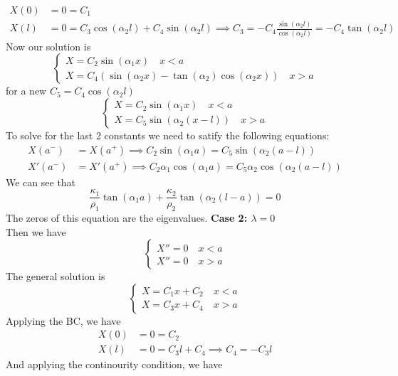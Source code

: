 \documentclass[answers,12pt,addpoints]{exam}
\begin{document}
\begin{questions}
\begin{solution}
        \begin{align*}
            X(0) &= 0 = C_1 \\
            X(l) &= 0 = C_3 \cos(\alpha_2 l) + C_4 \sin(\alpha_2 l) \implies C_3 = -C_4 \frac{\sin(\alpha_2 l)}{\cos(\alpha_2 l)} = -C_4 \tan(\alpha_2 l)
        \end{align*}
        Now our solution is
        $$\begin{cases}
            X = C_2 \sin(\alpha_1 x) \quad x < a \\
            X = C_4 (\sin(\alpha_2 x) - \tan(\alpha_2 )\cos(\alpha_2 x)) \quad x > a
        \end{cases}$$
        for a new $C_5 = C_4 \cos(\alpha_2 l)$
        $$ \begin{cases}
            X = C_2 \sin(\alpha_1 x) \quad x < a \\
            X = C_5 \sin(\alpha_2 (x-l))  \quad x > a
        \end{cases}$$
        To solve for the last 2 constants we need to satify the following equations:
        \begin{align*}
            X(a^-) &= X(a^+) \implies C_2 \sin(\alpha_1 a) = C_5 \sin(\alpha_2 (a-l)) \\
            X'(a^-) &= X'(a^+) \implies C_2 \alpha_1 \cos(\alpha_1 a) = C_5 \alpha_2 \cos(\alpha_2 (a-l))
        \end{align*}
        We can see that $$ \frac{\kappa_1}{\rho_1} \tan(\alpha_1 a) + \frac{\kappa_2}{\rho_2} \tan(\alpha_2 (l-a)) = 0$$ 
        The zeros of this equation are the eigenvalues.
        \textbf{Case 2: $\lambda = 0$} \\
        Then we have $$\begin{cases}
            X'' = 0 \quad x < a \\
            X'' = 0 \quad x > a
        \end{cases}$$
        The general solution is
        $$\begin{cases}
            X = C_1 x + C_2 \quad x < a \\
            X = C_3 x + C_4 \quad x > a
        \end{cases}$$
        Applying the BC, we have
        \begin{align*}
            X(0) &= 0 = C_2 \\
            X(l) &= 0 = C_3 l + C_4 \implies C_4 = -C_3 l
        \end{align*}
        And applying the continourity condition, we have 
        \begin{align*}

\end{align*}
\end{solution}
\end{questions}
\end{document}
